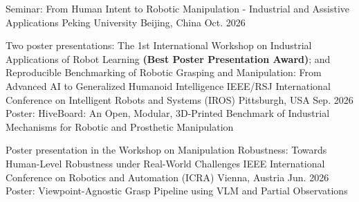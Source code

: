 \begin{cventries}


  \cventry
    {Seminar: From Human Intent to Robotic Manipulation - Industrial and Assistive Applications} %
    {Peking University} %
    {Beijing, China} %
    {Oct. 2026} %
    {}
\vspace{-20pt} 


  \cventry
    {Two poster presentations: The 1st International Workshop on Industrial Applications of Robot Learning \textbf{(Best Poster Presentation Award)}; and Reproducible Benchmarking of Robotic Grasping and Manipulation: From Advanced AI to Generalized Humanoid Intelligence} %
    {IEEE/RSJ International Conference on Intelligent Robots and Systems (IROS)} %
    {Pittsburgh, USA} %
    {Sep. 2026} %
    {Poster: HiveBoard: An Open, Modular, 3D-Printed Benchmark of Industrial Mechanisms for Robotic and Prosthetic Manipulation}
\vspace{-5pt} 



  \cventry
    {Poster presentation in the Workshop on Manipulation Robustness:
Towards Human-Level Robustness under Real-World Challenges} %
    {IEEE International Conference on Robotics and Automation (ICRA)} %
    {Vienna, Austria} %
    {Jun. 2026} %
    {Poster: Viewpoint-Agnostic Grasp Pipeline using VLM and Partial Observations}
\vspace{-5pt} 




\end{cventries}
